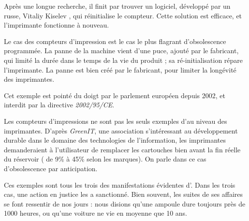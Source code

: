 Après une longue recherche, il finit par trouver un logiciel, développé par un russe, Vitaliy Kiselev , qui réinitialise le compteur. Cette solution est efficace, et l'imprimante fonctionne à nouveau.


Le cas des compteurs d'impression est le cas le plus flagrant d'obsolescence programmée. La panne de la machine vient d'une puce, ajouté par le fabricant, qui limité la durée dans le temps de la vie du produit ; sa ré-initialisation répare l'imprimante. La panne est bien créé par le fabricant, pour limiter la longévité  des imprimantes.

Cet exemple est pointé du doigt par le parlement européen depuis 2002, et interdit par la directive \textit{2002/95/CE}. 
\smallbreak

Les compteurs d'impressions ne sont pas les seuls exemples d'\op au niveau des imprimantes. D'après \textit{GreenIT}\cite{greenit_cartouche_encre}, une association s'intéressant au développement durable  dans le domaine des  technologies de l'information, les imprimantes demanderaient à l'utilisateur de remplacer les cartouches bien avant la fin réelle du réservoir ( de 9\% à 45\% selon les marques). On parle dans ce cas d'obsolescence par anticipation.


\medbreak

Ces exemples sont tous les trois des manifestations évidentes d'\op. Dans les trois cas, une action en justice les a sanctionné. Bien souvent, les suites de ses affaires se font ressentir de nos jours : nous disions qu'une ampoule dure toujours près de 1000 heures, ou qu'une voiture ne vie en moyenne que 10 ans. 